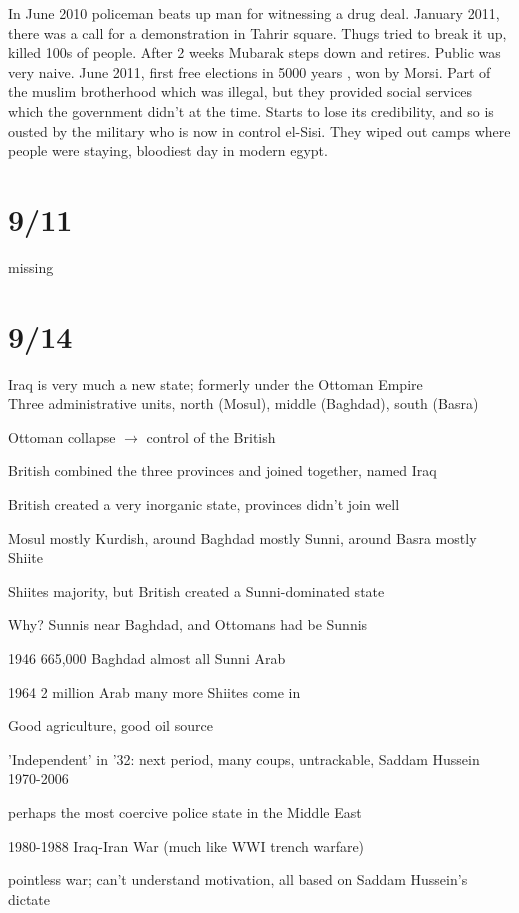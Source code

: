 \documentclass[12pt]{article}
\begin{document}
In June 2010 policeman beats up man for witnessing a drug deal. January 2011, there was a call for a demonstration in Tahrir square. Thugs tried to break it up, killed 100s of people. After 2 weeks Mubarak steps down and retires. Public was very naive. June 2011, first free elections in 5000 years , won by Morsi. Part of the muslim brotherhood which was illegal, but they provided social services which the government didn't at the time. Starts to lose its credibility, and so is ousted by the military who is now in control el-Sisi. They wiped out camps where people were staying, bloodiest day in modern egypt. 

\section{9/11}

missing

\newpage
\section{9/14}

Iraq is very much a new state; formerly under the Ottoman Empire\\

Three administrative units, north (Mosul), middle (Baghdad), south (Basra)

Ottoman collapse $\to$ control of the British

British combined the three provinces and joined together, named Iraq

British created a very inorganic state, provinces didn't join well

Mosul mostly Kurdish, around Baghdad mostly Sunni, around Basra mostly Shiite

Shiites majority, but British created a Sunni-dominated state

Why? Sunnis near Baghdad, and Ottomans had be Sunnis

1946 665,000 Baghdad almost all Sunni Arab

1964 2 million Arab many more Shiites come in

Good agriculture, good oil source

'Independent' in '32: next period, many coups, untrackable, Saddam Hussein 1970-2006

perhaps the most coercive police state in the Middle East

1980-1988 Iraq-Iran War (much like WWI trench warfare)

pointless war; can't understand motivation, all based on Saddam Hussein's dictate
\end{document}
